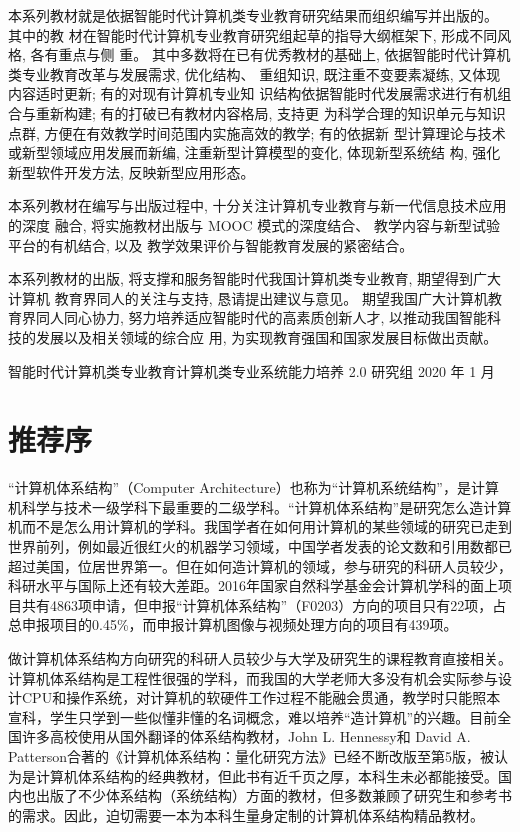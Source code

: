 \documentclass[]{ctexbook}
\begin{document}
本系列教材就是依据智能时代计算机类专业教育研究结果而组织编写并出版的。 其中的教
材在智能时代计算机专业教育研究组起草的指导大纲框架下, 形成不同风格, 各有重点与侧
重。 其中多数将在已有优秀教材的基础上, 依据智能时代计算机类专业教育改革与发展需求,
优化结构、 重组知识, 既注重不变要素凝练, 又体现内容适时更新; 有的对现有计算机专业知
识结构依据智能时代发展需求进行有机组合与重新构建; 有的打破已有教材内容格局, 支持更
为科学合理的知识单元与知识点群, 方便在有效教学时间范围内实施高效的教学; 有的依据新
型计算理论与技术或新型领域应用发展而新编, 注重新型计算模型的变化, 体现新型系统结
构, 强化新型软件开发方法, 反映新型应用形态。

本系列教材在编写与出版过程中, 十分关注计算机专业教育与新一代信息技术应用的深度
融合, 将实施教材出版与 MOOC 模式的深度结合、 教学内容与新型试验平台的有机结合, 以及
教学效果评价与智能教育发展的紧密结合。

本系列教材的出版, 将支撑和服务智能时代我国计算机类专业教育, 期望得到广大计算机
教育界同人的关注与支持, 恳请提出建议与意见。 期望我国广大计算机教育界同人同心协力,
努力培养适应智能时代的高素质创新人才, 以推动我国智能科技的发展以及相关领域的综合应
用, 为实现教育强国和国家发展目标做出贡献。

智能时代计算机类专业教育计算机类专业系统能力培养 2.0 研究组
2020 年 1 月

\hypertarget{ux63a8ux8350ux5e8f}{%
\chapter*{推荐序}\label{ux63a8ux8350ux5e8f}}



``计算机体系结构''（Computer Architecture）也称为``计算机系统结构''，是计算机科学与技术一级学科下最重要的二级学科。``计算机体系结构''是研究怎么造计算机而不是怎么用计算机的学科。我国学者在如何用计算机的某些领域的研究已走到世界前列，例如最近很红火的机器学习领域，中国学者发表的论文数和引用数都已超过美国，位居世界第一。但在如何造计算机的领域，参与研究的科研人员较少，科研水平与国际上还有较大差距。2016年国家自然科学基金会计算机学科的面上项目共有4863项申请，但申报``计算机体系结构''（F0203）方向的项目只有22项，占总申报项目的0.45\%，而申报计算机图像与视频处理方向的项目有439项。

做计算机体系结构方向研究的科研人员较少与大学及研究生的课程教育直接相关。计算机体系结构是工程性很强的学科，而我国的大学老师大多没有机会实际参与设计CPU和操作系统，对计算机的软硬件工作过程不能融会贯通，教学时只能照本宣科，学生只学到一些似懂非懂的名词概念，难以培养``造计算机''的兴趣。目前全国许多高校使用从国外翻译的体系结构教材，John L. Hennessy和 David A. Patterson合著的《计算机体系结构：量化研究方法》已经不断改版至第5版，被认为是计算机体系结构的经典教材，但此书有近千页之厚，本科生未必都能接受。国内也出版了不少体系结构（系统结构）方面的教材，但多数兼顾了研究生和参考书的需求。因此，迫切需要一本为本科生量身定制的计算机体系结构精品教材。
\end{document}
